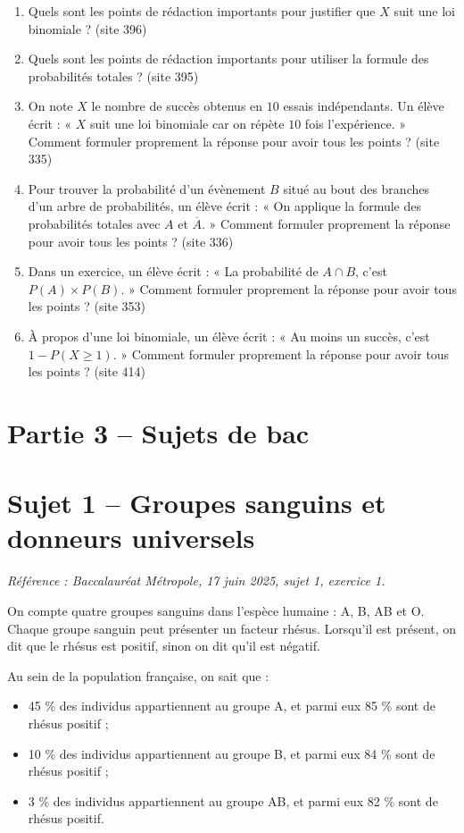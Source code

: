 \documentclass[11pt,a4paper]{article}
\newcommand{\origine}[1]{ {\scriptsize\textcolor{bleufonce}{(site #1)}}}
\newcounter{question}
\newenvironment{blocquestions}[1]{%
  \begin{tcolorbox}[
    enhanced,
    breakable,
    colback=bleuclair,
    colframe=bleufonce,
    boxrule=0.6pt,
    arc=2mm,
    left=2mm,right=2mm,top=2mm,bottom=1.5mm,
    title={\bfseries #1},
    coltitle=white,
    colbacktitle=bleufonce,
    before skip=3mm,
    after skip=3mm, fontupper=\large
  ]
  \large
  \begin{enumerate}[leftmargin=*,label=\textbf{\arabic*.},itemsep=0.45em,topsep=0.5em]
  \setcounter{enumi}{\value{question}}
}{%
  \setcounter{question}{\value{enumi}}
  \end{enumerate}
  \end{tcolorbox}
}
\begin{document}
\begin{blocquestions}{E. Rédaction type bac}
\item Quels sont les points de rédaction importants pour justifier que \(X\) suit une loi binomiale ? \origine{396}
\item Quels sont les points de rédaction importants pour utiliser la formule des probabilités totales ? \origine{395}
\item On note \(X\) le nombre de succès obtenus en \(10\) essais indépendants. Un élève écrit : « \(X\) suit une loi binomiale car on répète \(10\) fois l'expérience. » Comment formuler proprement la réponse pour avoir tous les points ? \origine{335}
\item Pour trouver la probabilité d'un évènement \(B\) situé au bout des branches d'un arbre de probabilités, un élève écrit : « On applique la formule des probabilités totales avec \(A\) et \(\overline{A}\). » Comment formuler proprement la réponse pour avoir tous les points ? \origine{336}
\item Dans un exercice, un élève écrit : « La probabilité de \(A\cap B\), c'est \(P(A)\times P(B)\). » Comment formuler proprement la réponse pour avoir tous les points ? \origine{353}
\item À propos d'une loi binomiale, un élève écrit : « Au moins un succès, c'est \(1-P(X\geqslant 1)\). » Comment formuler proprement la réponse pour avoir tous les points ? \origine{414}
\end{blocquestions}

\clearpage

\section*{Partie 3 -- Sujets de bac}
\section*{Sujet 1 -- Groupes sanguins et donneurs universels}
{\small\emph{Référence : Baccalauréat Métropole, 17 juin 2025, sujet 1, exercice 1.}}

On compte quatre groupes sanguins dans l'espèce humaine : A, B, AB et O. Chaque groupe sanguin peut présenter un facteur rhésus. Lorsqu'il est présent, on dit que le rhésus est positif, sinon on dit qu'il est négatif.

Au sein de la population française, on sait que :
\begin{itemize}
  \item 45 \% des individus appartiennent au groupe A, et parmi eux 85 \% sont de rhésus positif ;
  \item 10 \% des individus appartiennent au groupe B, et parmi eux 84 \% sont de rhésus positif ;
  \item 3 \% des individus appartiennent au groupe AB, et parmi eux 82 \% sont de rhésus positif.
\end{itemize}
\end{document}

